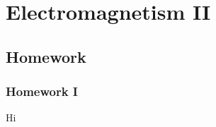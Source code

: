 \documentclass[crop=false,class=book]{standalone}
\begin{document}
\chapter{Electromagnetism II}
\section{Homework}
\subsection{Homework I}
Hi
\end{document}
